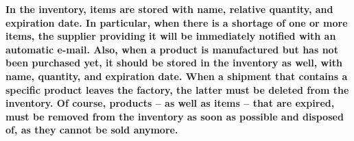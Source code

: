 \textbf{In the inventory, items are stored with name, relative quantity, and expiration date. In particular, when there is a shortage of one or more items, the supplier providing it will be immediately notified with an automatic e-mail. Also, when a product is manufactured but has not been purchased yet, it should be stored in
the inventory as well, with name, quantity, and expiration date. When a shipment that contains a specific product leaves the factory, the latter must be deleted from the inventory. Of course, products -- as well as items -- that are expired, must be removed from the inventory as soon as possible and disposed of, as they cannot be sold anymore.}

%
%
%
%
